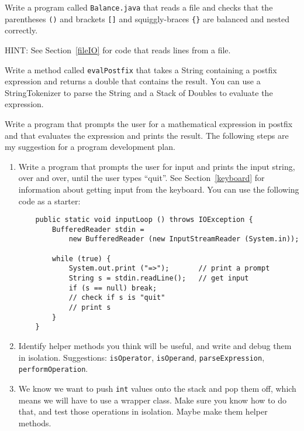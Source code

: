 \begin{exercise}
Write a program called {\tt Balance.java} that reads a file
and checks that the parentheses {\tt ()} and brackets {\tt []}
and squiggly-braces {\tt \{\}} are balanced and nested correctly.

HINT: See Section~\ref{fileIO} for code that reads lines
from a file.
\end{exercise}


\begin{exercise}
Write a method called {\tt evalPostfix} that takes a String containing
a postfix expression and returns a double that contains the result.
You can use a StringTokenizer to parse the String and a Stack of
Doubles to evaluate the expression.
\end{exercise}

\begin{exercise}
Write a program that prompts the user for a mathematical
expression in postfix and that evaluates the expression and
prints the result.
The following steps are my suggestion for a program development
plan.

\begin {enumerate}

\item Write a program that prompts the user for input and prints the
input string, over and over, until the user types ``quit''.  See
Section~\ref{keyboard} for information about getting input from the
keyboard.  You can use the following code as a starter:

\begin{verbatim}
    public static void inputLoop () throws IOException {
        BufferedReader stdin =
            new BufferedReader (new InputStreamReader (System.in));
	
        while (true) {
            System.out.print ("=>");       // print a prompt
            String s = stdin.readLine();   // get input
            if (s == null) break;
            // check if s is "quit"
            // print s
        }
    }
\end{verbatim}

\item Identify helper methods you think will be useful, and
write and debug them in isolation.  Suggestions: {\tt isOperator},
{\tt isOperand}, {\tt parseExpression}, {\tt performOperation}.

\item We know we want to push {\tt int} values onto the stack
and pop them off, which means we will have to use a wrapper class.
Make sure you know how to do that, and test those operations in
isolation.  Maybe make them helper methods.


\end{enumerate}
\end{exercise}
